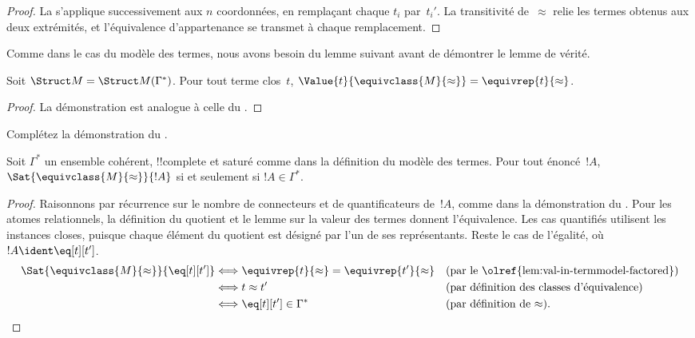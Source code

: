 \documentclass[../../../include/open-logic-section]{subfiles}
\begin{document}
\begin{proof}
La  s'applique successivement
aux $n$ coordonnées, en remplaçant chaque $t_i$ par~$t_i'$. La
transitivité de~$\approx$ relie les termes obtenus aux deux extrémités,
et l'équivalence d'appartenance se transmet à chaque remplacement.
\end{proof}

Comme dans le cas du modèle des termes, nous avons besoin du lemme
suivant avant de démontrer le lemme de vérité.

\begin{lem}
Soit $\Struct M=\Struct M(\Gamma^*)$. Pour tout terme clos~$t$,
$\Value{t}{\equivclass{M}{\approx}}=\equivrep{t}{\approx}$.
\end{lem}
\begin{proof}
La démonstration est analogue à celle du
.
\end{proof}

\begin{prob}
Complétez la démonstration du
.
\end{prob}

\begin{lem}
Soit $\Gamma^*$ un ensemble cohérent, !!{complete} et saturé
comme dans la définition du modèle des termes.
Pour tout énoncé~$!A$,
$\Sat{\equivclass{M}{\approx}}{!A}$ si et seulement si
$!A\in\Gamma^*$.
\end{lem}

\begin{proof}
Raisonnons par récurrence sur le nombre de connecteurs et de
quantificateurs de~$!A$, comme dans la démonstration du
. Pour les atomes relationnels, la définition du
quotient et le lemme sur la valeur des termes donnent l'équivalence.
Les cas quantifiés utilisent les instances closes, puisque chaque
élément du quotient est désigné par l'un de ses représentants.
Reste le cas de l'égalité, où $!A\ident\eq[t][t']$.
\begin{align*}
\Sat{\equivclass{M}{\approx}}{\eq[t][t']}
&\Longleftrightarrow \equivrep{t}{\approx}=\equivrep{t'}{\approx}
  &&\text{(par le \olref{lem:val-in-termmodel-factored})}\\
&\Longleftrightarrow t\approx t'
  &&\text{(par définition des classes d'équivalence)}\\
&\Longleftrightarrow \eq[t][t']\in\Gamma^*
  &&\text{(par définition de $\approx$).}
\end{align*}
\end{proof}
\end{document}
